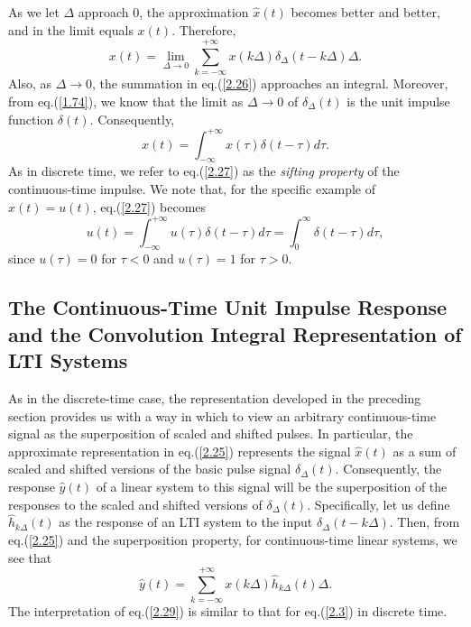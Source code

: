 \documentclass[a4paper,10pt,twoside]{book}
\begin{document}
As we let $\Delta$ approach 0, the approximation $\hat{x}(t)$ becomes better and better, and in the limit equals $x(t)$. Therefore,
\begin{equation}
    x(t) = \lim_{\Delta\to0}\sum_{k=-\infty}^{+\infty}x(k\Delta)\delta_{\Delta}(t-k\Delta)\Delta.
    \label{2.26}
\end{equation}
Also, as $\Delta\to 0$, the summation in eq.\;(\ref{2.26}) approaches an integral. Moreover, from eq.\;(\ref{1.74}), we know that the limit as $\Delta\to 0$ of $\delta_\Delta(t)$ is the unit impulse function $\delta(t)$. Consequently,
\begin{equation}
    x(t) = \int_{-\infty}^{+\infty}x(\tau)\delta(t-\tau)d\tau.
    \label{2.27}
\end{equation}
As in discrete time, we refer to eq.\;(\ref{2.27}) as the \textit{sifting property} of the continuous-time impulse. We note that, for the specific example of $x(t)=u(t)$, eq.\;(\ref{2.27}) becomes
\begin{equation}
    u(t) = \int_{-\infty}^{+\infty}u(\tau)\delta(t-\tau)d\tau = \int_{0}^{\infty}\delta(t-\tau)d\tau,
    \label{2.28}
\end{equation}
since $u(\tau)=0$ for $\tau<0$ and $u(\tau)=1$ for $\tau>0$.

\subsection{The Continuous-Time Unit Impulse Response and the Convolution Integral Representation of LTI Systems}

As in the discrete-time case, the representation developed in the preceding section provides us with a way in which to view an arbitrary continuous-time signal as the superposition of scaled and shifted pulses. In particular, the approximate representation in eq.\;(\ref{2.25}) represents the signal $\hat{x}(t)$ as a sum of scaled and shifted versions of the basic pulse signal $\delta_\Delta(t)$. Consequently, the response $\hat{y}(t)$ of a linear system to this signal will be the superposition of the responses to the scaled and shifted versions of $\delta_\Delta(t)$. Specifically, let us define $\hat{h}_{k\Delta}(t)$ as the response of an LTI system to the input $\delta_\Delta(t-k\Delta)$. Then, from eq.\;(\ref{2.25}) and the superposition property, for continuous-time linear systems, we see that
\begin{equation}
    \hat{y}(t) = \sum_{k=-\infty}^{+\infty}x(k\Delta)\hat{h}_{k\Delta}(t)\Delta.
    \label{2.29}
\end{equation}
The interpretation of eq.\;(\ref{2.29}) is similar to that for eq.\;(\ref{2.3}) in discrete time.
\end{document}
